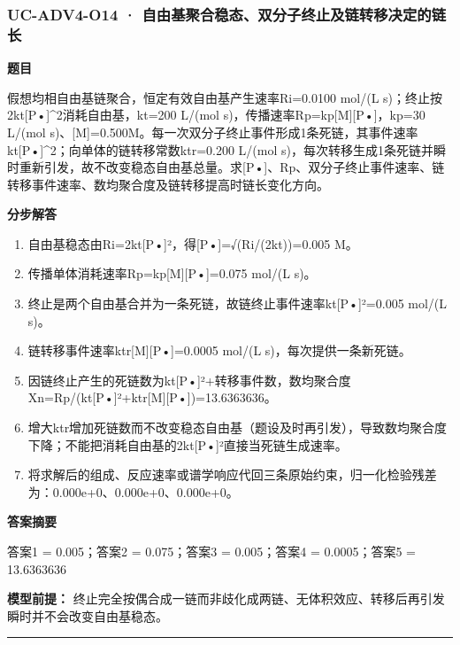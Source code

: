\documentclass[UTF8,11pt,a4paper]{ctexart}
\begin{document}
\subsubsection*{UC-ADV4-O14 · 自由基聚合稳态、双分子终止及链转移决定的链长}
\noindent\textbf{题目}\par
假想均相自由基链聚合，恒定有效自由基产生速率Ri=0.0100 mol/(L s)；终止按2kt[P•]\textasciicircum{}2消耗自由基，kt=200 L/(mol s)，传播速率Rp=kp[M][P•]，kp=30 L/(mol s)、[M]=0.500M。每一次双分子终止事件形成1条死链，其事件速率kt[P•]\textasciicircum{}2；向单体的链转移常数ktr=0.200 L/(mol s)，每次转移生成1条死链并瞬时重新引发，故不改变稳态自由基总量。求[P•]、Rp、双分子终止事件速率、链转移事件速率、数均聚合度及链转移提高时链长变化方向。\par
\medskip\noindent\textbf{分步解答}
\begin{enumerate}
\item 自由基稳态由Ri=2kt[P•]²，得[P•]=√(Ri/(2kt))=0.005 M。
\item 传播单体消耗速率Rp=kp[M][P•]=0.075 mol/(L s)。
\item 终止是两个自由基合并为一条死链，故链终止事件速率kt[P•]²=0.005 mol/(L s)。
\item 链转移事件速率ktr[M][P•]=0.0005 mol/(L s)，每次提供一条新死链。
\item 因链终止产生的死链数为kt[P•]²+转移事件数，数均聚合度Xn=Rp/(kt[P•]²+ktr[M][P•])=13.6363636。
\item 增大ktr增加死链数而不改变稳态自由基（题设及时再引发），导致数均聚合度下降；不能把消耗自由基的2kt[P•]²直接当死链生成速率。
\item 将求解后的组成、反应速率或谱学响应代回三条原始约束，归一化检验残差为：0.000e+0、0.000e+0、0.000e+0。
\end{enumerate}
\noindent\textbf{答案摘要}\par
答案1 = 0.005；答案2 = 0.075；答案3 = 0.005；答案4 = 0.0005；答案5 = 13.6363636\par
\noindent\textbf{模型前提：}
终止完全按偶合成一链而非歧化成两链、无体积效应、转移后再引发瞬时并不会改变自由基稳态。\par
\medskip\hrule\medskip
{}
\end{document}
